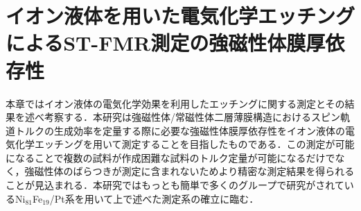 
\chapter{イオン液体を用いた電気化学エッチングによるST-FMR測定の強磁性体膜厚依存性}\label{ILEtchingchap}
本章ではイオン液体の電気化学効果を利用したエッチングに関する測定とその結果を述べ考察する．本研究は強磁性体/常磁性体二層薄膜構造におけるスピン軌道トルクの生成効率を定量する際に必要な強磁性体膜厚依存性をイオン液体の電気化学エッチングを用いて測定することを目指したものである．この測定が可能になることで複数の試料が作成困難な試料のトルク定量が可能になるだけでなく，強磁性体のばらつきが測定に含まれないためより精密な測定結果を得られることが見込まれる．本研究ではもっとも簡単で多くのグループで研究がされているNi$_{81}$Fe$_{19}$/Pt系を用いて上で述べた測定系の確立に臨む．







